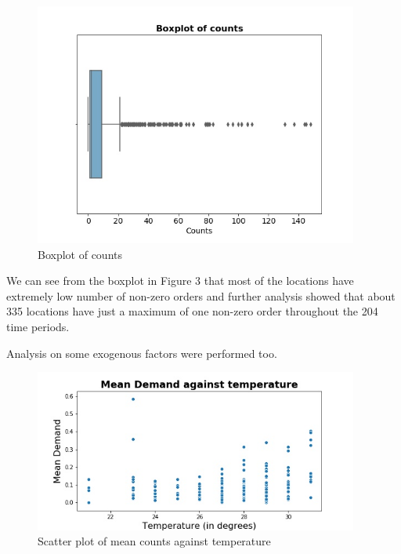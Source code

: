 \documentclass[12pt, letterpaper] {article}
\begin{document}
\begin{figure}[H]
    \centering
    \includegraphics[width=0.95\textwidth, height=0.4\textheight]{Images/boxplot_counts.jpg}
    \caption{Boxplot of counts}
    \label{fig:Boxplot of counts}
\end{figure}

\noindent We can see from the boxplot in Figure 3 that most of the locations have extremely low number of non-zero orders and further analysis showed that about 335 locations have just a maximum of one non-zero order throughout the 204 time periods. 

\noindent Analysis on some exogenous factors were performed too. 
\begin{figure}[H]
    \centering
    \includegraphics[width=0.95\textwidth, height=0.32\textheight]{Images/temp_mean_demand.jpg}
    \caption{Scatter plot of mean counts against temperature}
    \label{fig:Scatter plot of mean counts against temperature}
\end{figure}
\end{document}
